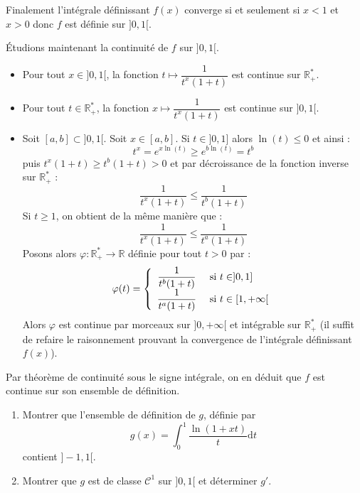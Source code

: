 \documentclass[a4paper,twoside,french,11pt]{VcCours}
\newcommand{\dt}{\text{d}t}
\begin{document}
\noindent Finalement l'intégrale définissant $f(x)$ converge si et seulement si $x<1$ et $x>0$ donc $f$ est définie sur $]0,1[$.


\noindent Étudions maintenant la continuité de $f$ sur $]0,1[$.
\begin{itemize}
\item Pour tout $x \in ]0,1[$, la fonction $t \mapsto \dfrac{1}{t^x(1+t)}$ est continue sur $\mathbb{R}_+^{*}$.
\item Pour tout $t \in \mathbb{R}_+^{*}$, la fonction $x \mapsto  \dfrac{1}{t^x(1+t)}$ est continue sur $]0,1[$.
\item Soit $[a,b] \subset ]0,1[$. Soit $x \in [a,b]$. Si $t \in ]0,1]$ alors $\ln(t) \leq 0$ et ainsi :
$$ t^x = e^{x \ln(t)} \geq e^{b \ln(t)} = t^b$$
puis $t^x(1+t) \geq t^b (1+t)>0$ et par décroissance de la fonction inverse sur $\mathbb{R}_+^{*}$ :
$$ \dfrac{1}{t^x(1+t)} \leq \dfrac{1}{t^b(1+t)}$$
Si $t \geq 1$, on obtient de la même manière que :
$$  \dfrac{1}{t^x(1+t)} \leq \dfrac{1}{t^a(1+t)}$$
Posons alors $\varphi : \mathbb{R}_+^{*} \rightarrow \mathbb{R}$ définie pour tout $t>0$ par :
$$ \varphi(t) = \left\lbrace  \begin{array}{cl}
\dfrac{1}{t^b(1+t)} & \hbox{ si } t \in ]0,1] \\
\dfrac{1}{t^a(1+t)} & \hbox{ si } t \in [1, + \infty[ 
\end{array}\right.$$
Alors $\varphi$ est continue par morceaux sur $]0, + \infty[$ et intégrable sur $\mathbb{R}_+^{*}$ (il suffit de refaire le raisonnement prouvant la convergence de l'intégrale définissant $f(x)$).
\end{itemize}
Par théorème de continuité sous le signe intégrale, on en déduit que $f$ est continue sur son ensemble de définition.



\begin{Exercice}{} 
\begin{enumerate}
\item Montrer que l'ensemble de définition de $g$, définie par 
$$ g(x) = \int_{0}^1 \dfrac{\ln(1+xt)}{t} \dt$$
contient $]-1,1[$.
\item Montrer que $g$ est de classe $\mathcal{C}^1$ sur $]0,1[$ et déterminer $g'$.
\end{enumerate}
\end{Exercice}
\end{document}
